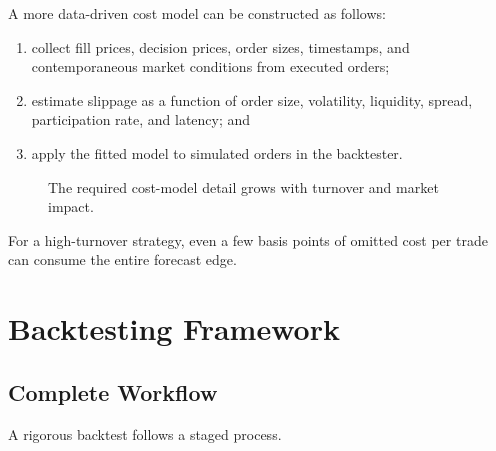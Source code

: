 \documentclass[12pt,openany]{book}
\theoremstyle{definition}
\theoremstyle{remark}
\begin{document}
A more data-driven cost model can be constructed as follows:
\begin{enumerate}
    \item collect fill prices, decision prices, order sizes, timestamps, and
    contemporaneous market conditions from executed orders;
    \item estimate slippage as a function of order size, volatility,
    liquidity, spread, participation rate, and latency; and
    \item apply the fitted model to simulated orders in the backtester.
\end{enumerate}

\begin{figure}[H]
\centering
{}
\caption{The required cost-model detail grows with turnover and market impact.}
\label{fig:cost-model-detail}
\end{figure}

For a high-turnover strategy, even a few basis points of omitted cost per
trade can consume the entire forecast edge.


\section{Backtesting Framework}

\subsection{Complete Workflow}

A rigorous backtest follows a staged process.
\end{document}
